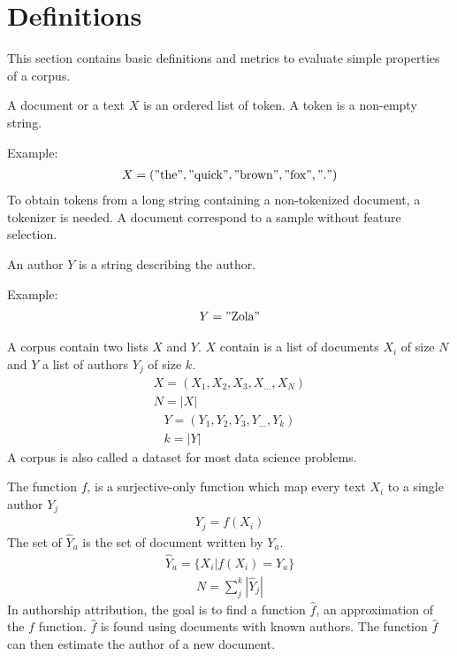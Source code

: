 \section{Definitions \label{sec:definitions}}

This section contains basic definitions and metrics to evaluate simple properties of a corpus.

\begin{definition}
  A document or a text $X$ is an ordered list of token.
  A token is a non-empty string.

  Example:
  \begin{gather*}
    X = ("\text{the}", "\text{quick}", "\text{brown}", "\text{fox}", "\text{.}")
  \end{gather*}
  To obtain tokens from a long string containing a non-tokenized document, a tokenizer is needed.
  A document correspond to a sample without feature selection.
\end{definition}

\begin{definition}[Author]
  An author $Y$ is a string describing the author.

  Example:
  \begin{gather*}
    Y = "\text{Zola}"
  \end{gather*}
\end{definition}

\begin{definition}[Corpus]
  A corpus contain two lists $X$ and $Y$.
  $X$ contain is a list of documents $X_i$ of size $N$ and $Y$ a list of authors $Y_j$ of size $k$.
  \begin{gather*}
    X = (X_1, X_2, X_3, X_{...}, X_N) \\
    N = |X|
  \end{gather*}
  \begin{gather*}
    Y = (Y_1, Y_2, Y_3, Y_{...}, Y_k) \\
    k = |Y|
  \end{gather*}
  A corpus is also called a dataset for most data science problems.
\end{definition}

\begin{definition}
  The function $f$, is a surjective-only function which map every text $X_i$ to a single author $Y_j$
  \begin{gather*}
    Y_j = f(X_i)
  \end{gather*}
  The set of $\hat{Y}_a$ is the set of document written by $Y_a$.
  \begin{gather*}
    \hat{Y}_a = \{X_i | f(X_i) = Y_a\}
  \end{gather*}
  \begin{gather*}
    N = \sum_{j}^k |\hat{Y}_j|
  \end{gather*}
  In authorship attribution, the goal is to find a function $\hat{f}$, an approximation of the $f$ function.
  $\hat{f}$ is found using documents with known authors.
  The function $\hat{f}$ can then estimate the author of a new document.
\end{definition}

